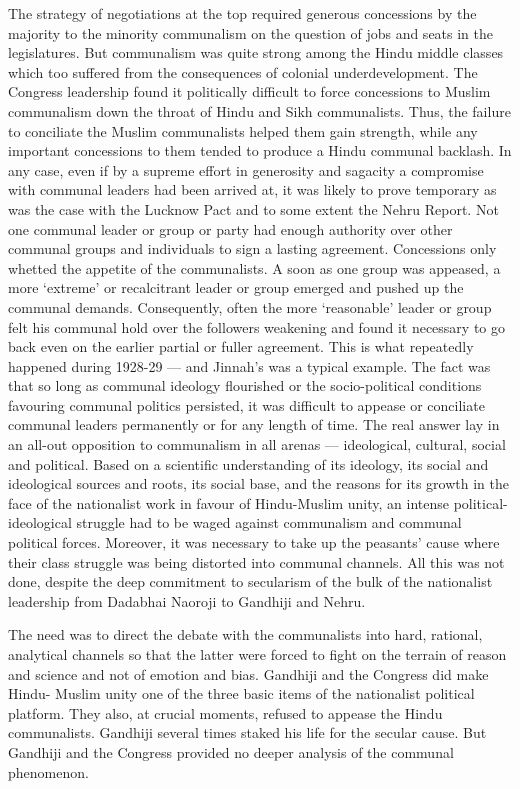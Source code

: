 The strategy of negotiations at the top required generous concessions by the majority to the minority communalism on the question of jobs and seats in the legislatures. But communalism was quite strong among the Hindu middle classes which too suffered from the consequences of colonial underdevelopment. The Congress leadership found it politically difficult to force concessions to Muslim communalism down the throat of Hindu and Sikh communalists. Thus, the failure to conciliate the Muslim communalists helped them gain strength, while any important concessions to them tended to produce a Hindu communal backlash. In any case, even if by a supreme effort in generosity and sagacity a compromise with communal leaders had been arrived at, it was likely to prove temporary as was the case with the Lucknow Pact and to some extent the Nehru Report. Not one communal leader or group or party had enough authority over other communal groups and individuals to sign a lasting agreement. Concessions only whetted the appetite of the communalists. A soon as one group was appeased, a more `extreme' or recalcitrant leader or group emerged and pushed up the communal demands. Consequently, often the more `reasonable' leader or group felt his communal hold over the followers weakening and found it necessary to go back even on the earlier partial or fuller agreement. This is what repeatedly happened during 1928-29 — and Jinnah's was a typical example. The fact was that so long as communal ideology flourished or the socio-political conditions favouring communal politics persisted, it was difficult to appease or conciliate communal leaders permanently or for any length of time. The real answer lay in an all-out opposition to communalism in all arenas — ideological, cultural, social and political. Based on a scientific understanding of its ideology, its social and ideological sources and roots, its social base, and the reasons for its growth in the face of the nationalist work in favour of Hindu-Muslim unity, an intense political-ideological struggle had to be waged against communalism and communal political forces. Moreover, it was necessary to take up the peasants' cause where their class struggle was being distorted into communal channels. All this was not done, despite the deep commitment to secularism of the bulk of the nationalist leadership from Dadabhai Naoroji to Gandhiji and Nehru. 

The need was to direct the debate with the communalists into hard, rational, analytical channels so that the latter were forced to fight on the terrain of reason and science and not of emotion and bias. Gandhiji and the Congress did make Hindu- Muslim unity one of the three basic items of the nationalist political platform. They also, at crucial moments, refused to appease the Hindu communalists. Gandhiji several times staked his life for the secular cause. But Gandhiji and the Congress provided no deeper analysis of the communal phenomenon. 

